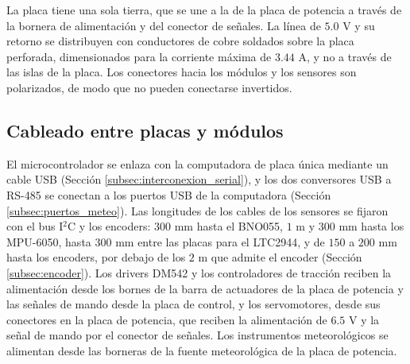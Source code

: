 \documentclass[../../General.tex]{subfiles}
\begin{document}
La placa tiene una sola tierra, que se une a la de la placa de potencia a través de la bornera de alimentación y del conector de señales. La línea de $5.0\text{ V}$ y su retorno se distribuyen con conductores de cobre soldados sobre la placa perforada, dimensionados para la corriente máxima de $3.44\text{ A}$, y no a través de las islas de la placa. Los conectores hacia los módulos y los sensores son polarizados, de modo que no pueden conectarse invertidos.

\subsection{Cableado entre placas y módulos}

El microcontrolador se enlaza con la computadora de placa única mediante un cable USB (Sección \ref{subsec:interconexion_serial}), y los dos conversores USB a RS-485 se conectan a los puertos USB de la computadora (Sección \ref{subsec:puertos_meteo}). Las longitudes de los cables de los sensores se fijaron con el bus I$^2$C y los encoders: $300\text{ mm}$ hasta el BNO055, $1\text{ m}$ y $300\text{ mm}$ hasta los MPU-6050, hasta $300\text{ mm}$ entre las placas para el LTC2944, y de $150$ a $200\text{ mm}$ hasta los encoders, por debajo de los $2\text{ m}$ que admite el encoder (Sección \ref{subsec:encoder}). Los drivers DM542 y los controladores de tracción reciben la alimentación desde los bornes de la barra de actuadores de la placa de potencia y las señales de mando desde la placa de control, y los servomotores, desde sus conectores en la placa de potencia, que reciben la alimentación de $6.5\text{ V}$ y la señal de mando por el conector de señales. Los instrumentos meteorológicos se alimentan desde las borneras de la fuente meteorológica de la placa de potencia.
\end{document}
